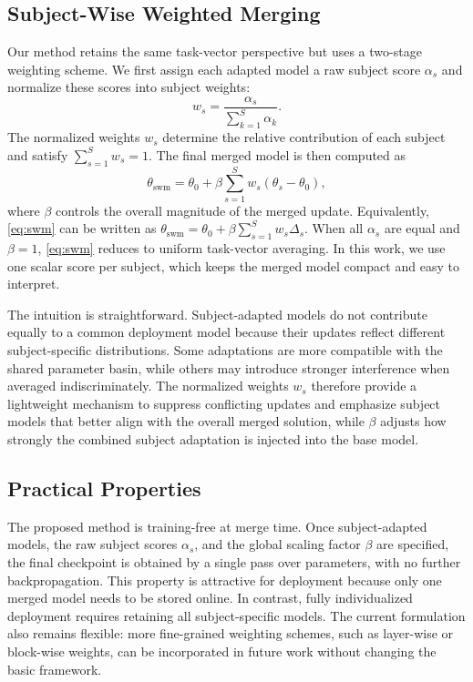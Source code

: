 \documentclass[conference]{IEEEtran}
\begin{document}
\subsection{Subject-Wise Weighted Merging}
Our method retains the same task-vector perspective but uses a two-stage weighting scheme. We first assign each adapted model a raw subject score $\alpha_s$ and normalize these scores into subject weights:
\begin{equation}
w_s = \frac{\alpha_s}{\sum_{k=1}^{S}\alpha_k}.
\end{equation}
The normalized weights $w_s$ determine the relative contribution of each subject and satisfy $\sum_{s=1}^{S}w_s = 1$. The final merged model is then computed as
\begin{equation}
\theta_{\mathrm{swm}} = \theta_{0} + \beta\sum_{s=1}^{S}w_s(\theta_s-\theta_0),
\label{eq:swm}
\end{equation}
where $\beta$ controls the overall magnitude of the merged update. Equivalently, \eqref{eq:swm} can be written as $\theta_{\mathrm{swm}} = \theta_0 + \beta\sum_{s=1}^{S}w_s\Delta_s$. When all $\alpha_s$ are equal and $\beta=1$, \eqref{eq:swm} reduces to uniform task-vector averaging. In this work, we use one scalar score per subject, which keeps the merged model compact and easy to interpret.

The intuition is straightforward. Subject-adapted models do not contribute equally to a common deployment model because their updates reflect different subject-specific distributions. Some adaptations are more compatible with the shared parameter basin, while others may introduce stronger interference when averaged indiscriminately. The normalized weights $w_s$ therefore provide a lightweight mechanism to suppress conflicting updates and emphasize subject models that better align with the overall merged solution, while $\beta$ adjusts how strongly the combined subject adaptation is injected into the base model.

\subsection{Practical Properties}
The proposed method is training-free at merge time. Once subject-adapted models, the raw subject scores $\alpha_s$, and the global scaling factor $\beta$ are specified, the final checkpoint is obtained by a single pass over parameters, with no further backpropagation. This property is attractive for deployment because only one merged model needs to be stored online. In contrast, fully individualized deployment requires retaining all subject-specific models. The current formulation also remains flexible: more fine-grained weighting schemes, such as layer-wise or block-wise weights, can be incorporated in future work without changing the basic framework.
\end{document}
